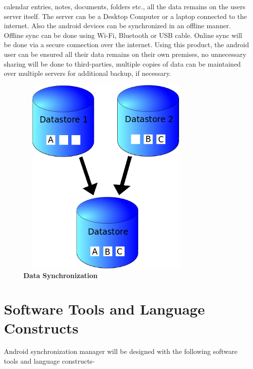 calendar entries, notes, documents, folders etc., all the data remains on the users server itself.
The server can be a Desktop Computer or a laptop connected to the internet. Also the android
devices can be synchronized in an offline manner.\\[0.5cm]
\hspace*{0.82cm}Offline sync can be done using Wi-Fi, Bluetooth or USB cable. Online sync will be
done via a secure connection over the internet. Using this product, the android user can be
ensured all their data remains on their own premises, no unnecessary sharing will be done to
third-parties, multiple copies of data can be maintained over multiple servers for additional
backup, if necessary.\\[0.3cm]

\begin{figure}[H]
  \centering
    \includegraphics[height= 10cm, width=9cm]{project/images/data-sync}
  \caption{\textbf{Data Synchronization}}
\end{figure}
\newpage
\section{Software Tools and Language Constructs}
\hspace*{0.82cm}Android synchronization manager will be designed with the following software tools and 
language constructs-
